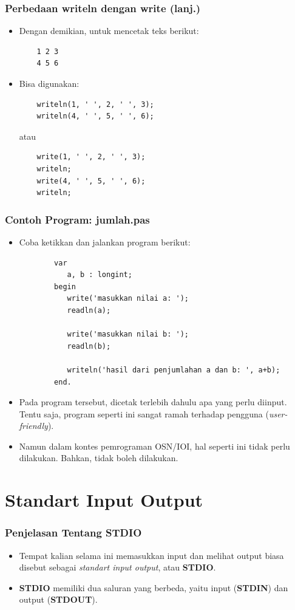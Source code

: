 \documentclass{beamer}
\begin{document}
\begin{frame}[fragile]
\frametitle{Perbedaan writeln dengan write (lanj.)}
\begin{itemize}
	\item Dengan demikian, untuk mencetak teks berikut:
	\begin{lstlisting}
	1 2 3
	4 5 6
	\end{lstlisting}
	\item Bisa digunakan:
	\begin{lstlisting}
	writeln(1, ' ', 2, ' ', 3);
	writeln(4, ' ', 5, ' ', 6);
	\end{lstlisting}
	atau
	\begin{lstlisting}
	write(1, ' ', 2, ' ', 3);
	writeln;
	write(4, ' ', 5, ' ', 6);
	writeln;
	\end{lstlisting}
\end{itemize}
\end{frame}

\begin{frame}[fragile]
\frametitle{Contoh Program: jumlah.pas}
\begin{itemize}
	\item Coba ketikkan dan jalankan program berikut:
	\begin{lstlisting}
		var
		   a, b : longint;
		begin
		   write('masukkan nilai a: ');
		   readln(a);

		   write('masukkan nilai b: ');
		   readln(b);
		   
		   writeln('hasil dari penjumlahan a dan b: ', a+b);
		end.
	\end{lstlisting}
	\item Pada program tersebut, dicetak terlebih dahulu apa yang perlu diinput. Tentu saja, program seperti ini sangat ramah terhadap pengguna (\textit{user-friendly}).
	\item Namun dalam kontes pemrograman OSN/IOI, hal seperti \newline ini tidak perlu dilakukan. Bahkan, tidak boleh dilakukan.
\end{itemize}
\end{frame}

\section{Standart Input Output}
\frame{\sectionpage}

\begin{frame}
\frametitle{Penjelasan Tentang STDIO}
\begin{itemize}
	\item Tempat kalian selama ini memasukkan input dan melihat output biasa disebut sebagai \textit{standart input output}, atau \textbf{STDIO}.
	\item \textbf{STDIO} memiliki dua saluran yang berbeda, yaitu input (\textbf{STDIN}) dan output (\textbf{STDOUT}).
\end{itemize}
\end{frame}
\end{document}

